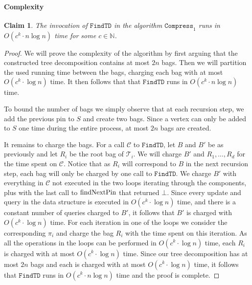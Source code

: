 \documentclass[a4paper,11pt]{article}
\newtheorem{claim}[lemma]{Claim}
\theoremstyle{definition}
\theoremstyle{remark}
\newcommand{\findTD}{\mathtt{FindTD}}
\newcommand{\compress}[1]{\mathtt{Compress}_{#1}}
\newcommand{\qpin}{\textnormal{findNextPin}}
\newcommand{\td}{\mathcal{T}} \newcommand{\tw}{\mathrm{tw}} \newcommand{\w}{\mathrm{w}}
\begin{document}
\paragraph{Complexity}
\begin{claim}
  \label{claim:findtd-nlogn-complexity}
  The invocation of $\findTD$ in the algorithm $\compress{1}$ runs in
  $O(c^k\cdot n \log n)$ time for some $c \in \mathbb{N}$.
\end{claim}
\begin{proof}
  We will prove the complexity of the algorithm by first arguing that
  the constructed tree decomposition contains at most $2n$ bags.  Then
  we will partition the used running time between the bags, charging
  each bag with at most $O(c^k\cdot \log n)$ time.  It then follows
  that that $\findTD$ runs in $O(c^k\cdot n \log n)$ time.
  


  To bound the number of bags we simply observe that at each recursion
  step, we add the previous pin to $S$ and create two bags.  Since a
  vertex can only be added to $S$ one time during the entire process,
  at most $2n$ bags are created.
  
  \newcommand{\reccall}{\mathcal{C}}
  
  It remains to charge the bags.  For a call $\reccall$ to $\findTD$,
  let $B$ and $B'$ be as previously and let $R_i$ be the root bag of
  $\td_i$.  We will charge $B'$ and $R_1, \dots, R_d$ for the time
  spent on $\reccall$.  Notice that as $R_i$ will correspond to $B$ in
  the next recursion step, each bag will only be charged by one call
  to $\findTD$.  We charge $B'$ with everything in $\reccall$ not
  executed in the two loops iterating through the components, plus
  with the last call to $\qpin$ that returned $\bot$.  Since every
  update and query in the data structure is executed in $O(c^k\cdot
  \log n)$ time, and there is a constant number of queries charged to
  $B'$, it follows that $B'$ is charged with $O(c^k\cdot \log n)$
  time.  For each iteration in one of the loops we consider the
  corresponding $\pi_i$ and charge the bag $R_i$ with the time spent
  on this iteration.  As all the operations in the loops can be
  performed in $O(c^k\cdot \log n)$ time, each $R_i$ is charged with
  at most $O(c^k\cdot \log n)$ time.  Since our tree decomposition has
  at most $2n$ bags and each is charged with at most $O(c^k\cdot \log
  n)$ time, it follows that $\findTD$ runs in $O(c^k\cdot n \log n)$
  time and the proof is complete.
\end{proof}
\end{document}

